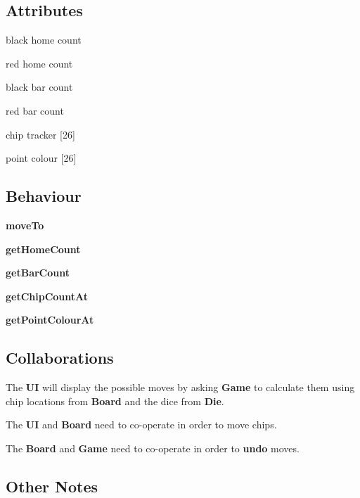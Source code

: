 \documentclass{report}
\begin{document}
\begin{multicols}{2}
    \begin{dashed}
        \subsection{Attributes}
        \item black home count
        \item red home count
        \item black bar count
        \item red bar count
        \item chip tracker [26]
        \item point colour [26]
    \end{dashed}

    \begin{dashed}
        \subsection{Behaviour}
        \item \textbf{moveTo}
        \item \textbf{getHomeCount}
        \item \textbf{getBarCount}
        \item \textbf{getChipCountAt}
        \item \textbf{getPointColourAt}
    \end{dashed}
\end{multicols}

\subsection{Collaborations}

\begin{dashed}
    \item The \textbf{UI} will display the possible moves by asking \textbf{Game} to calculate them using chip locations from \textbf{Board} and the dice from \textbf{Die}.
    \item The \textbf{UI} and \textbf{Board} need to co-operate in order to move chips.
    \item The \textbf{Board} and \textbf{Game} need to co-operate in order to \textbf{undo} moves.
\end{dashed}

\subsection{Other Notes}
\end{document}
